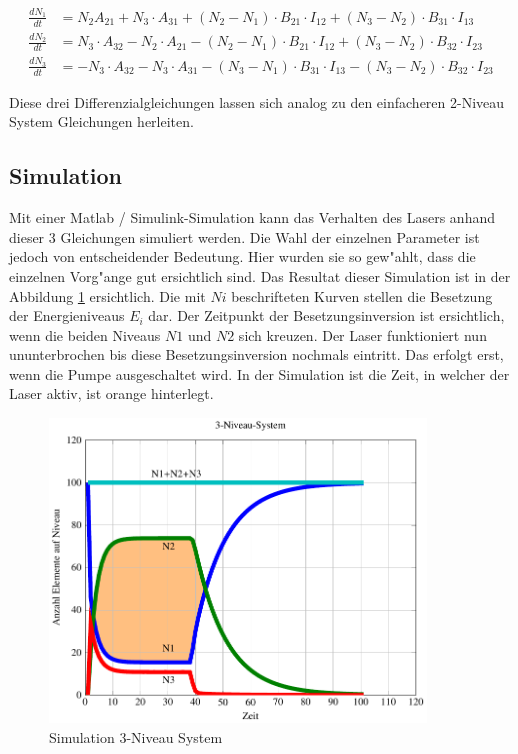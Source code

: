 \begin{refsection}
\begin{align*}
\frac{dN_1}{dt} &=
N_2  A_{21} 
+ N_3 \cdot  A_{31}
+ (N_2 - N_1) \cdot B_{21}\cdot  I_{12}
+ (N_3 - N_2) \cdot B_{31}\cdot  I_{13}\\
\frac{dN_2}{dt} &=
N_3 \cdot  A_{32} 
- N_2 \cdot  A_{21}
- (N_2 - N_1) \cdot  B_{21}\cdot  I_{12}
+ (N_3 - N_2) \cdot  B_{32}\cdot  I_{23}\\
\frac{dN_3}{dt} &=
- N_3 \cdot  A_{32}
- N_3 \cdot  A_{31}
- (N_3 - N_1) \cdot  B_{31}\cdot  I_{13}
- (N_3 - N_2) \cdot  B_{32}\cdot  I_{23}
\end{align*}


Diese drei Differenzialgleichungen lassen sich analog zu den einfacheren
2-Niveau System Gleichungen herleiten.\cite{Lasergrundlagen}

\subsection{Simulation}
\label{3-Niveau Simulation}
Mit einer Matlab / Simulink-Simulation kann das Verhalten des Lasers anhand
dieser 3 Gleichungen simuliert werden.
Die Wahl der einzelnen Parameter ist jedoch von entscheidender Bedeutung.
Hier wurden sie so gew"ahlt, dass die einzelnen Vorg"ange gut ersichtlich sind.
Das Resultat dieser Simulation ist in der Abbildung
\ref{Simulation 3-Niveau System} ersichtlich.
Die mit $Ni$ beschrifteten Kurven stellen die Besetzung der Energieniveaus
$E_i$ dar.
Der Zeitpunkt der Besetzungsinversion ist ersichtlich, wenn die beiden Niveaus
$N1$ und $N2$ sich kreuzen.
Der Laser funktioniert nun ununterbrochen bis diese Besetzungsinversion
nochmals eintritt.
Das erfolgt erst, wenn die Pumpe ausgeschaltet wird.
In der Simulation ist die Zeit, in welcher der Laser aktiv, ist orange
hinterlegt.

\begin{flushleft}
\begin{figure}
\centering
\includegraphics[width = 10cm]{laser/bilder/3_niveau.pdf}
\caption{Simulation 3-Niveau System}
\label{Simulation 3-Niveau System}


\end{figure}
\end{flushleft}
\end{refsection}
